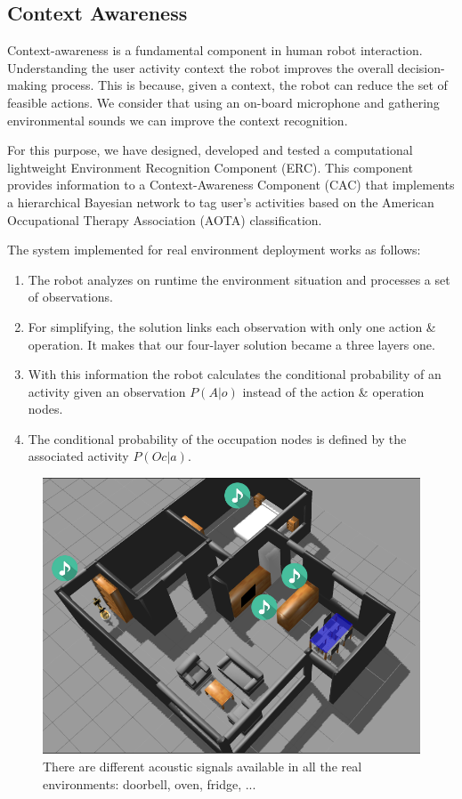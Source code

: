 \documentclass[citeauthoryear]{llncs}
\begin{document}
\subsection{Context Awareness}


Context-awareness is a fundamental component in human robot interaction. Understanding the user activity context the robot improves the overall decision-making process. This is because, given a context, the robot can reduce the set of  feasible actions. 
We consider that using an on-board microphone and gathering environmental sounds we can improve the context recognition.

For this purpose, we have designed, developed and tested  a computational lightweight Environment Recognition Component (ERC). %
This component provides information to a Context-Awareness Component (CAC) that implements a hierarchical Bayesian network to tag user's activities based on the American Occupational Therapy Association (AOTA)  classification. 



The system implemented for real environment deployment  works as follows: 
\begin{enumerate}
 \item The robot analyzes on runtime the environment situation and processes a set of observations. 
 \item For simplifying, the solution links each observation with only one action \& operation. It makes that our four-layer solution became a three layers one.%
 \item With this information the robot calculates the conditional probability of an activity given an observation $P(A|o)$ instead of the action \& operation nodes. 
 \item The conditional probability of the occupation nodes is defined by the associated activity  $P(Oc|a)$.
\end{enumerate}


\begin{figure}[ht]
    \centering
    \includegraphics[width=.6\textwidth]{SimulatorContext}
    \caption{There are different acoustic signals available in all the real environments: doorbell, oven, fridge, ...}
  \label{fig:contextsimulator}
\end{figure}
\end{document}
